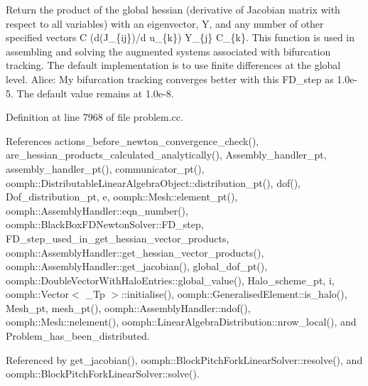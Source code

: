 Return the product of the global hessian (derivative of Jacobian matrix with respect to all variables) with an eigenvector, Y, and any number of other specified vectors C (d(J\+\_\+\{ij\})/d u\+\_\+\{k\}) Y\+\_\+\{j\} C\+\_\+\{k\}. This function is used in assembling and solving the augmented systems associated with bifurcation tracking. The default implementation is to use finite differences at the global level. Alice\+: My bifurcation tracking converges better with this F\+D\+\_\+step as 1.\+0e-\/5. The default value remains at 1.\+0e-\/8. 

Definition at line 7968 of file problem.\+cc.



References actions\+\_\+before\+\_\+newton\+\_\+convergence\+\_\+check(), are\+\_\+hessian\+\_\+products\+\_\+calculated\+\_\+analytically(), Assembly\+\_\+handler\+\_\+pt, assembly\+\_\+handler\+\_\+pt(), communicator\+\_\+pt(), oomph\+::\+Distributable\+Linear\+Algebra\+Object\+::distribution\+\_\+pt(), dof(), Dof\+\_\+distribution\+\_\+pt, e, oomph\+::\+Mesh\+::element\+\_\+pt(), oomph\+::\+Assembly\+Handler\+::eqn\+\_\+number(), oomph\+::\+Black\+Box\+F\+D\+Newton\+Solver\+::\+F\+D\+\_\+step, F\+D\+\_\+step\+\_\+used\+\_\+in\+\_\+get\+\_\+hessian\+\_\+vector\+\_\+products, oomph\+::\+Assembly\+Handler\+::get\+\_\+hessian\+\_\+vector\+\_\+products(), oomph\+::\+Assembly\+Handler\+::get\+\_\+jacobian(), global\+\_\+dof\+\_\+pt(), oomph\+::\+Double\+Vector\+With\+Halo\+Entries\+::global\+\_\+value(), Halo\+\_\+scheme\+\_\+pt, i, oomph\+::\+Vector$<$ \+\_\+\+Tp $>$\+::initialise(), oomph\+::\+Generalised\+Element\+::is\+\_\+halo(), Mesh\+\_\+pt, mesh\+\_\+pt(), oomph\+::\+Assembly\+Handler\+::ndof(), oomph\+::\+Mesh\+::nelement(), oomph\+::\+Linear\+Algebra\+Distribution\+::nrow\+\_\+local(), and Problem\+\_\+has\+\_\+been\+\_\+distributed.



Referenced by get\+\_\+jacobian(), oomph\+::\+Block\+Pitch\+Fork\+Linear\+Solver\+::resolve(), and oomph\+::\+Block\+Pitch\+Fork\+Linear\+Solver\+::solve().

\mbox{\label{classoomph_1_1Problem_a8d7cc317f4900e076dec400ce2493c19}} 
